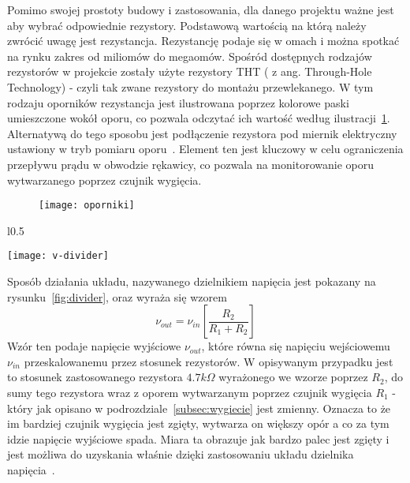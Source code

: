 	Pomimo swojej prostoty budowy i zastosowania, dla danego projektu ważne jest aby wybrać odpowiednie rezystory. Podstawową wartością na którą należy zwrócić uwagę jest rezystancja. Rezystancję podaje się w omach i można spotkać na rynku zakres od miliomów do megaomów. Spośród dostępnych rodzajów rezystorów w projekcie zostały użyte rezystory THT ( z ang. Through-Hole Technology) - czyli tak zwane rezystory do montażu przewlekanego. W tym rodzaju oporników rezystancja jest ilustrowana poprzez kolorowe paski umieszczone wokół oporu, co pozwala odczytać ich wartość według ilustracji~\ref{fig:oporniki}. Alternatywą do tego sposobu jest podłączenie rezystora pod miernik elektryczny ustawiony w tryb pomiaru oporu~\cite{rezystor}. Element ten jest kluczowy w celu ograniczenia przepływu prądu w obwodzie rękawicy, co pozwala na monitorowanie oporu wytwarzanego poprzez czujnik wygięcia.
		
\begin{figure}[h]
\centering
\texttt{[image: oporniki]}
\label{fig:oporniki}
\end{figure}
	


	
\begin{wrapfigure}{l}{0.5\textwidth}
\begin{center}
\texttt{[image: v-divider]}
\label{fig:divider}
\end{center}
\end{wrapfigure}
Sposób działania układu, nazywanego dzielnikiem napięcia jest pokazany na rysunku~\ref{fig:divider}, oraz wyraża się wzorem
	$$
		\nu_{out} = \nu_{in}\left[ \frac{R_2}{R_1+R_2}\right]
	$$	
Wzór ten podaje napięcie wyjściowe $\nu_{out}$, które równa się napięciu wejściowemu $\nu_{in}$ przeskalowanemu przez stosunek rezystorów. W opisywanym przypadku jest to stosunek zastosowanego rezystora $4.7 k\Omega$ wyrażonego we wzorze poprzez $R_2$, do sumy tego rezystora wraz z oporem wytwarzanym poprzez czujnik wygięcia $R_1$ - który jak opisano w podrozdziale~\ref{subsec:wygiecie} jest zmienny. Oznacza to że im bardziej czujnik wygięcia jest zgięty, wytwarza on większy opór a co za tym idzie napięcie wyjściowe spada. Miara ta obrazuje jak bardzo palec jest zgięty i jest możliwa do uzyskania właśnie dzięki zastosowaniu układu dzielnika napięcia~\cite{v-divider}.


